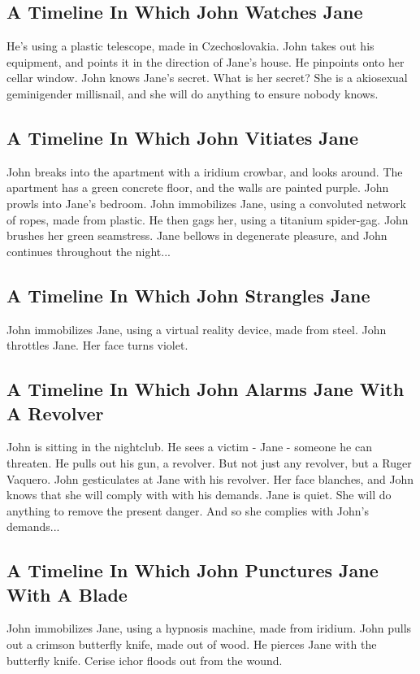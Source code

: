 \documentclass{article}
\begin{document}
\subsection{A Timeline In Which John Watches Jane}


He's using a plastic telescope, made in Czechoslovakia.
John takes out his equipment, and points it in the direction of Jane's house. He pinpoints onto her cellar window.
John knows Jane's secret. What is her secret? She is a akiosexual geminigender millisnail, and she will do anything to ensure nobody knows.
\subsection{A Timeline In Which John Vitiates Jane}


John breaks into the apartment with a iridium crowbar, and looks around.
The apartment has a green concrete floor, and the walls are painted purple.
John prowls into Jane's bedroom.
John immobilizes Jane, using a convoluted network of ropes, made from plastic.
He then gags her, using a titanium spider{-}gag.
John brushes her green seamstress.
Jane bellows in degenerate pleasure, and John continues throughout the night...
\subsection{A Timeline In Which John Strangles Jane}


John immobilizes Jane, using a virtual reality device, made from steel.
John throttles Jane.
Her face turns violet.
\subsection{A Timeline In Which John Alarms Jane With A Revolver}


John is sitting in the nightclub.
He sees a victim {-} Jane {-} someone he can threaten. He pulls out his gun, a revolver.
But not just any revolver, but a Ruger Vaquero.
John gesticulates at Jane with his revolver. Her face blanches, and John knows that she will comply with with his demands.
Jane is quiet. She will do anything to remove the present danger. And so she complies with John's demands...
\subsection{A Timeline In Which John Punctures Jane With A Blade}


John immobilizes Jane, using a hypnosis machine, made from iridium.
John pulls out a crimson butterfly knife, made out of wood.
He pierces Jane with the butterfly knife.
Cerise ichor floods out from the wound.
\end{document}

